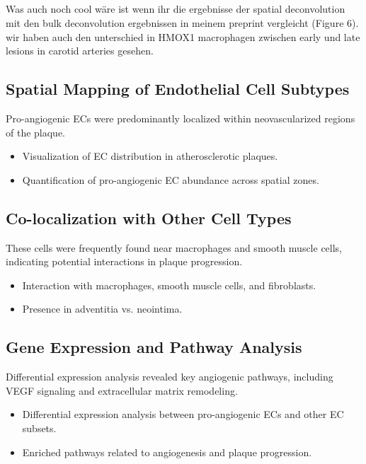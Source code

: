 \documentclass[a4paper,12pt]{article}
\begin{document}
\subsection{}
Was auch noch cool wäre ist wenn ihr die ergebnisse der spatial deconvolution mit den bulk deconvolution ergebnissen in meinem preprint vergleicht (Figure 6). wir haben auch den unterschied in HMOX1 macrophagen zwischen early und late lesions in carotid arteries gesehen.


\subsection{Spatial Mapping of Endothelial Cell Subtypes}
Pro-angiogenic ECs were predominantly localized within neovascularized regions of the plaque.

\begin{itemize}
  \item Visualization of EC distribution in atherosclerotic plaques.
  \item Quantification of pro-angiogenic EC abundance across spatial zones.
\end{itemize}

\subsection{Co-localization with Other Cell Types}
These cells were frequently found near macrophages and smooth muscle cells, indicating potential interactions in plaque progression.

\begin{itemize}
  \item Interaction with macrophages, smooth muscle cells, and fibroblasts.
  \item Presence in adventitia vs. neointima.
\end{itemize}

\subsection{Gene Expression and Pathway Analysis}
Differential expression analysis revealed key angiogenic pathways, including VEGF signaling and extracellular matrix remodeling.

\begin{itemize}
  \item Differential expression analysis between pro-angiogenic ECs and other EC subsets.
  \item Enriched pathways related to angiogenesis and plaque progression.
\end{itemize}
\end{document}
